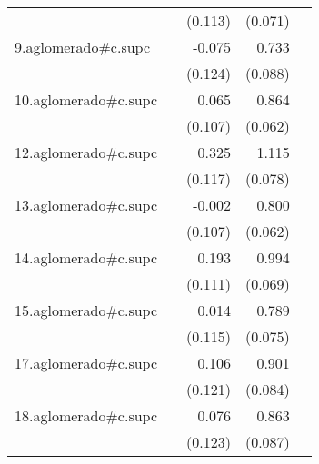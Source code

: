 {\begin{longtable}{l*{4}{D{.}{.}{-1}}}
            &                     &     (0.113)         &     (0.071)         &                     \\
\addlinespace
9.aglomerado#c.supc&                     &      -0.075         &       0.733\sym{***}&                     \\
            &                     &     (0.124)         &     (0.088)         &                     \\
\addlinespace
10.aglomerado#c.supc&                     &       0.065         &       0.864\sym{***}&                     \\
            &                     &     (0.107)         &     (0.062)         &                     \\
\addlinespace
12.aglomerado#c.supc&                     &       0.325\sym{**} &       1.115\sym{***}&                     \\
            &                     &     (0.117)         &     (0.078)         &                     \\
\addlinespace
13.aglomerado#c.supc&                     &      -0.002         &       0.800\sym{***}&                     \\
            &                     &     (0.107)         &     (0.062)         &                     \\
\addlinespace
14.aglomerado#c.supc&                     &       0.193         &       0.994\sym{***}&                     \\
            &                     &     (0.111)         &     (0.069)         &                     \\
\addlinespace
15.aglomerado#c.supc&                     &       0.014         &       0.789\sym{***}&                     \\
            &                     &     (0.115)         &     (0.075)         &                     \\
\addlinespace
17.aglomerado#c.supc&                     &       0.106         &       0.901\sym{***}&                     \\
            &                     &     (0.121)         &     (0.084)         &                     \\
\addlinespace
18.aglomerado#c.supc&                     &       0.076         &       0.863\sym{***}&                     \\
            &                     &     (0.123)         &     (0.087)         &                     \\

\end{longtable}}
